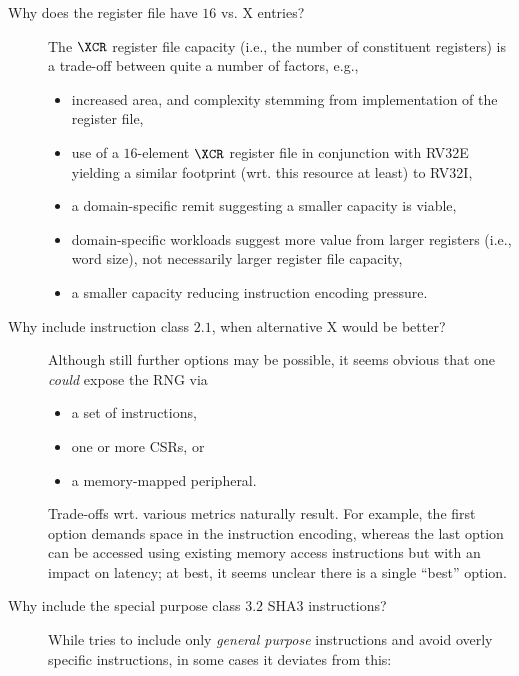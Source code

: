 \begin{description}
\item[Why does the \XCID register file have $16$ vs. X entries?]
      The $\XCR$ register file capacity (i.e., the number of constituent
      registers) is a trade-off between quite a number of factors, e.g.,

      \begin{itemize}
      \item increased area, and complexity stemming from implementation
            of the register file,
      \item use of a $16$-element $\XCR$ register file in conjunction
            with RV32E~\cite[Section 3]{SCARV:RV:ISA:I:17} yielding a 
            similar footprint (wrt. this resource at least) to RV32I,
      \item a domain-specific remit suggesting a smaller capacity is 
            viable,
      \item   domain-specific workloads suggest more value from larger 
            registers (i.e., word size), not necessarily larger register
            file capacity,
      \item a smaller capacity reducing instruction encoding pressure.
      \end{itemize}

\item[Why include instruction class $2.1$, when alternative X would be better?]
      Although still further options may be possible, it seems obvious
      that one {\em could} expose the RNG via

      \begin{itemize}
      \item a set of instructions,
      \item one or more CSRs,
            or
      \item a memory-mapped peripheral.
      \end{itemize}

      \noindent
      Trade-offs wrt. various metrics naturally result.  For example,
      the first option demands space in the instruction encoding, 
      whereas
      the last  option can be accessed using existing memory access instructions but with an impact on latency;
      at best, it seems unclear there is a single ``best'' option.

\item[Why include the special purpose class $3.2$ SHA3 instructions?]
      While \XCID tries to include only {\em general purpose} instructions and
      avoid overly specific instructions, in some cases it deviates from this:


\end{description}
